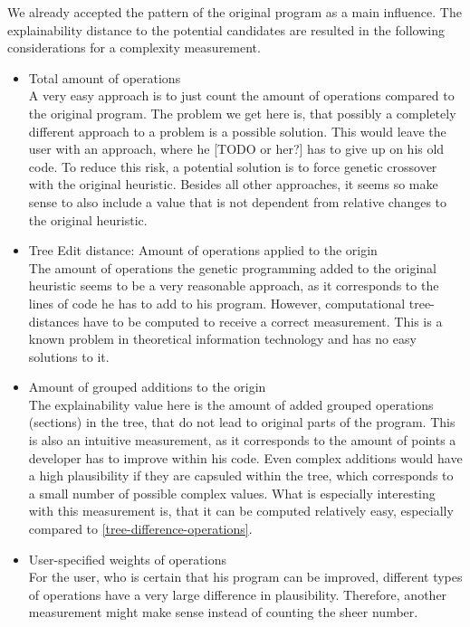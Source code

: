We already accepted the pattern of the original program as a main influence. The explainability distance to the potential candidates are  resulted in the following considerations for a complexity measurement.
\begin{itemize}
    \item Total amount of operations\\
    A very easy approach is to just count the amount of operations compared to the original program. The problem we get here is, that possibly a completely different approach to a problem is a possible solution. This would leave the user with an approach, where he [TODO or her?] has to give up on his old code. To reduce this risk, a potential solution is to force genetic crossover with the original heuristic. Besides all other approaches, it seems so make sense to also include a value that is not dependent from relative changes to the original heuristic.
    \item Tree Edit distance: Amount of operations applied to the origin\\
    The amount of operations the genetic programming added to the original heuristic seems to be a very reasonable approach, as it corresponds to the lines of code he has to add to his program. However, computational tree-distances have to be computed to receive a correct measurement. This is a known problem in theoretical information technology and has no easy solutions to it.  \label{tree-difference-operations}
    \item Amount of grouped additions to the origin \label{tree-difference-capsuled}\\
    The explainability value here is the amount of added grouped operations (sections) in the tree, that do not lead to original parts of the program. This is also an intuitive measurement, as it corresponds to the amount of points a developer has to improve within his code. Even complex additions would have a high plausibility if they are capsuled within the tree, which corresponds to a small number of possible complex values. What is especially interesting with this measurement is, that it can be computed relatively easy, especially compared to \ref{tree-difference-operations}.
    \item User-specified weights of operations\\
    For the user, who is certain that his program can be improved, different types of operations have a very large difference in plausibility. Therefore, another measurement might make sense instead of counting the sheer number.
    

\end{itemize}
